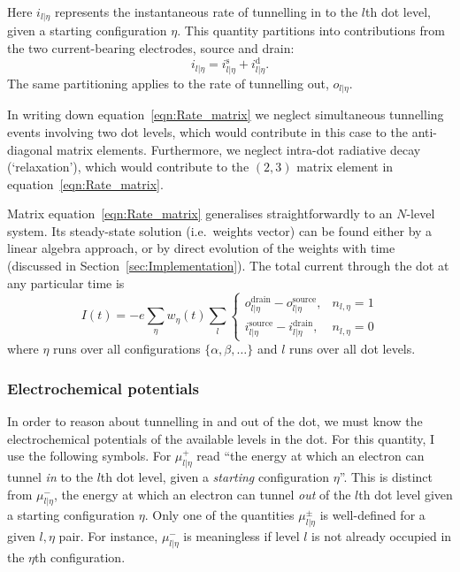 \documentclass[a4paper,11pt]{article}
\begin{document}
    Here $i_{l|\eta}$ represents the instantaneous rate of tunnelling in to the $l$th dot level, given a starting configuration $\eta$. This quantity partitions into contributions from the two current-bearing electrodes, source and drain:
    \begin{equation}\label{eqn:Partition}
        i_{l|\eta} = i_{l|\eta}^\mathrm{s} + i_{l|\eta}^\mathrm{d}.
    \end{equation}
    The same partitioning applies to the rate of tunnelling out, $o_{l|\eta}$.

    In writing down equation~\ref{eqn:Rate_matrix} we neglect simultaneous tunnelling events involving two dot levels, which would contribute in this case to the anti-diagonal matrix elements. Furthermore, we neglect intra-dot radiative decay (`relaxation'), which would contribute to the $(2,3)$ matrix element in equation~\ref{eqn:Rate_matrix}.

    Matrix equation~\ref{eqn:Rate_matrix} generalises straightforwardly to an $N$-level system. Its steady-state solution (i.e.\ weights vector) can be found either by a linear algebra approach, or by direct evolution of the weights with time (discussed in Section~\ref{sec:Implementation}). The total current through the dot at any particular time is
    \begin{equation}\label{eqn:Current}
        I{(t)} = -e \sum\limits_\eta w_\eta{(t)}
                   \sum\limits_l
                       \begin{cases}
                           o_{l|\eta}^\mathrm{drain} - o_{l|\eta}^\mathrm{source}, & n_{l,\eta} = 1 \\
                           i_{l|\eta}^\mathrm{source} - i_{l|\eta}^\mathrm{drain}, & n_{l,\eta} = 0
                       \end{cases}
    \end{equation}
    where $\eta$ runs over all configurations $\{\alpha, \beta,\dots\}$ and $l$ runs over all dot levels.

    \subsubsection{Electrochemical potentials}
    In order to reason about tunnelling in and out of the dot, we must know the electrochemical potentials of the available levels in the dot. For this quantity, I use the following symbols. For $\mu^+_{l|\eta}$ read ``the energy at which an electron can tunnel \textit{in} to the $l$th dot level, given a \textit{starting} configuration $\eta$''. This is distinct from $\mu^-_{l|\eta}$, the energy at which an electron can tunnel \textit{out} of the $l$th dot level given a starting configuration $\eta$. Only one of the quantities $\mu^\pm_{l|\eta}$ is well-defined for a given $l,\eta$ pair. For instance, $\mu^-_{l|\eta}$ is meaningless if level $l$ is not already occupied in the $\eta$th configuration.
\end{document}
